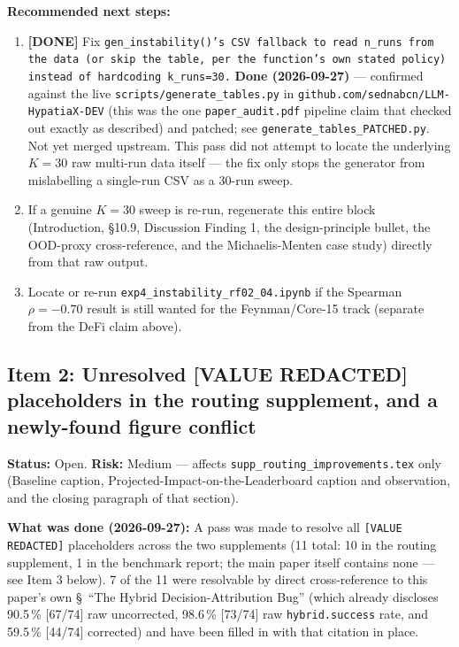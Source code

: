 \documentclass[11pt]{article}
\begin{document}
\textbf{Recommended next steps:}
\begin{enumerate}
  \item \textbf{[DONE]} Fix \texttt{gen\_instability()'s CSV fallback to read \texttt{n\_runs}
    from the data (or skip the table, per the function's own stated policy)
    instead of hardcoding \texttt{k\_runs=30}.} \textbf{Done (2026-09-27)} ---
    confirmed against the live \texttt{scripts/generate\_tables.py} in
    \texttt{github.com/sednabcn/LLM-HypatiaX-DEV} (this was the one
    \texttt{paper\_audit.pdf} pipeline claim that checked out exactly as
    described) and patched; see \texttt{generate\_tables\_PATCHED.py}.
    Not yet merged upstream. This pass did not attempt to locate the
    underlying $K=30$ raw multi-run data itself --- the fix only stops the
    generator from mislabelling a single-run CSV as a 30-run sweep.
  \item If a genuine $K=30$ sweep is re-run, regenerate this entire block
    (Introduction, \S10.9, Discussion Finding 1, the
    design-principle bullet, the OOD-proxy cross-reference, and the
    Michaelis-Menten case study) directly from that raw output.
  \item Locate or re-run \texttt{exp4\_instability\_rf02\_04.ipynb} if the
    Spearman $\rho=-0.70$ result is still wanted for the Feynman/Core-15
    track (separate from the DeFi claim above).
\end{enumerate}

\subsection*{Item 2: Unresolved [VALUE REDACTED] placeholders in the routing
supplement, and a newly-found figure conflict}
\textbf{Status:} Open. \textbf{Risk:} Medium — affects
\texttt{supp\_routing\_improvements.tex} only (Baseline caption,
Projected-Impact-on-the-Leaderboard caption and observation, and the
closing paragraph of that section).

\textbf{What was done (2026-09-27):} A pass was made to resolve all
\texttt{[VALUE REDACTED]} placeholders across the two supplements (11
total: 10 in the routing supplement, 1 in the benchmark report; the main
paper itself contains none — see Item 3 below). 7 of the 11 were
resolvable by direct cross-reference to this paper's own
\S~``The Hybrid Decision-Attribution Bug'' (which already discloses
90.5\,\% [67/74] raw uncorrected, 98.6\,\% [73/74] raw
\texttt{hybrid.success} rate, and 59.5\,\% [44/74] corrected) and have
been filled in with that citation in place.
\end{document}
